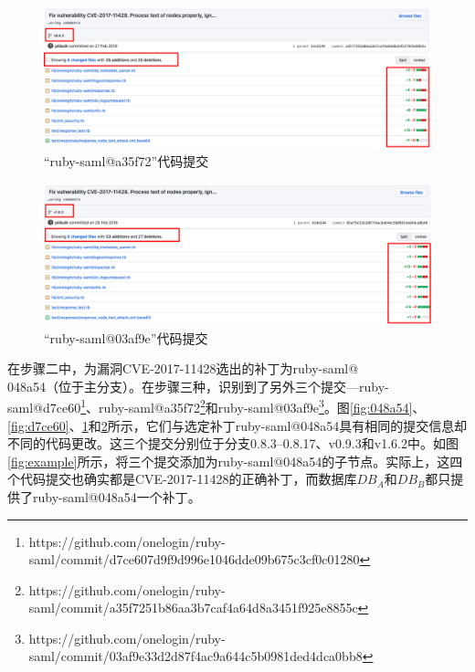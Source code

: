 \begin{figure}[!t]
    \centering
    \includegraphics[scale=0.30]{fig/11428-commit-a35f72}
    \caption{“ruby-saml@a35f72”代码提交}\label{fig:a35f72}
\end{figure}

\begin{figure}[!t]
    \centering
    \includegraphics[scale=0.30]{fig/11428-commit-03af9e}
    \caption{“ruby-saml@03af9e”代码提交}\label{fig:03af9e}
\end{figure}

\begin{exmp}
在步骤二中，\tool 为漏洞CVE-2017-11428选出的补丁为ruby-saml@\\048a54（位于主分支）。在步骤三种，\tool 识别到了另外三个提交---ruby-saml@d7ce60\footnote{https://github.com/onelogin/ruby-saml/commit/d7ce607d9f9d996e1046dde09b675c3cf0c01280}、ruby-saml@a35f72\footnote{https://github.com/onelogin/ruby-saml/commit/a35f7251b86aa3b7caf4a64d8a3451f925e8855c}和ruby-saml@03af9e\footnote{https://github.com/onelogin/ruby-saml/commit/03af9e33d2d87f4ac9a644c5b0981ded4dca0bb8}。图\ref{fig:048a54}、\ref{fig:d7ce60}、\ref{fig:a35f72}和\ref{fig:03af9e}所示，它们与选定补丁ruby-saml@048a54具有相同的提交信息却不同的代码更改。这三个提交分别位于分支0.8.3--0.8.17、v0.9.3和v1.6.2中。如图\ref{fig:example}所示，\tool 将三个提交添加为ruby-saml@048a54的子节点。实际上，这四个代码提交也确实都是CVE-2017-11428的正确补丁，而数据库$DB_A$和$DB_B$都只提供了ruby-saml@048a54一个补丁。
\end{exmp}

